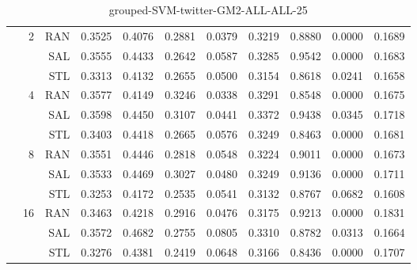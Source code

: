 \begin{center}
\begin{table}[htbp]
\begin{center}
\begin{tabular}{ | r | r | r | r | r | r | r | r | r | r | r |}
 & \multirow{3}{*}{2} & RAN & 0.3525 & 0.4076 & 0.2881 & 0.0379 & 0.3219 & 0.8880 & 0.0000 & 0.1689\\ \cline{3-11}
 &   & SAL & 0.3555 & 0.4433 & 0.2642 & 0.0587 & 0.3285 & 0.9542 & 0.0000 & 0.1683\\ \cline{3-11}
 &   & STL & 0.3313 & 0.4132 & 0.2655 & 0.0500 & 0.3154 & 0.8618 & 0.0241 & 0.1658\\ \cline{2-11}
 & \multirow{3}{*}{4} & RAN & 0.3577 & 0.4149 & 0.3246 & 0.0338 & 0.3291 & 0.8548 & 0.0000 & 0.1675\\ \cline{3-11}
 &   & SAL & 0.3598 & 0.4450 & 0.3107 & 0.0441 & 0.3372 & 0.9438 & 0.0345 & 0.1718\\ \cline{3-11}
 &   & STL & 0.3403 & 0.4418 & 0.2665 & 0.0576 & 0.3249 & 0.8463 & 0.0000 & 0.1681\\ \cline{2-11}
 & \multirow{3}{*}{8} & RAN & 0.3551 & 0.4446 & 0.2818 & 0.0548 & 0.3224 & 0.9011 & 0.0000 & 0.1673\\ \cline{3-11}
 &   & SAL & 0.3533 & 0.4469 & 0.3027 & 0.0480 & 0.3249 & 0.9136 & 0.0000 & 0.1711\\ \cline{3-11}
 &   & STL & 0.3253 & 0.4172 & 0.2535 & 0.0541 & 0.3132 & 0.8767 & 0.0682 & 0.1608\\ \cline{2-11}
 & \multirow{3}{*}{16} & RAN & 0.3463 & 0.4218 & 0.2916 & 0.0476 & 0.3175 & 0.9213 & 0.0000 & 0.1831\\ \cline{3-11}
 &   & SAL & 0.3572 & 0.4682 & 0.2755 & 0.0805 & 0.3310 & 0.8782 & 0.0313 & 0.1664\\ \cline{3-11}
 &   & STL & 0.3276 & 0.4381 & 0.2419 & 0.0648 & 0.3166 & 0.8436 & 0.0000 & 0.1707\\ \cline{2-11}
\hline
\end{tabular}
\caption{grouped-SVM-twitter-GM2-ALL-ALL-25}
\end{center}
 \end{table}
\end{center}

